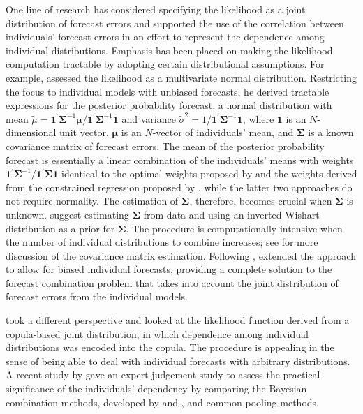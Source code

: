 \documentclass[11pt]{article}
\begin{document}
One line of research has considered specifying the likelihood as a joint distribution of forecast errors and supported the use of the correlation between individuals' forecast errors in an effort to represent the dependence among individual distributions. Emphasis has been placed on making the likelihood computation tractable by adopting certain distributional assumptions. For example, \cite{Winkler1981-bn} assessed the likelihood as a multivariate normal distribution. Restricting the focus to individual models with unbiased forecasts, he derived tractable expressions for the posterior probability forecast, a normal distribution with mean $\tilde{\mu} = \mathbf{1}^{\prime} \boldsymbol{\Sigma}^{-1} \boldsymbol{\mu} / \mathbf{1}^{\prime} \boldsymbol{\Sigma}^{-1} \mathbf{1}$ and variance $\tilde{\sigma}^{2} = 1/\mathbf{1}^{\prime} \boldsymbol{\Sigma}^{-1} \mathbf{1}$, where $\mathbf{1}$ is an $N$-dimensional unit vector, $\boldsymbol{\mu}$ is an $N$-vector of individuals' mean, and $\boldsymbol{\Sigma}$ is a known covariance matrix of forecast errors. The mean of the posterior probability forecast is essentially a linear combination of the individuals' means with weights $\mathbf{1}^{\prime} \boldsymbol{\Sigma}^{-1} / \mathbf{1}^{\prime} \boldsymbol{\Sigma} \mathbf{1}$ identical to the optimal weights proposed by \cite{Bates1969-yj} and the weights derived from the constrained regression proposed by \cite{Granger1984-jc}, while the latter two approaches do not require normality. The estimation of $\boldsymbol{\Sigma}$, therefore, becomes crucial when $\boldsymbol{\Sigma}$ is unknown. \cite{Winkler1981-bn} suggest estimating $\boldsymbol{\Sigma}$ from data and using an inverted Wishart distribution as a prior for $\boldsymbol{\Sigma}$. The procedure is computationally intensive when the number of individual distributions to combine increases; see \cite{Hall2004-tm} for more discussion of the covariance matrix estimation. Following \cite{Winkler1981-bn}, \cite{Palm1992-im} extended the approach to allow for biased individual forecasts, providing a complete solution to the forecast combination problem that takes into account the joint distribution of forecast errors from the individual models.

\cite{Jouini1996-fe} took a different perspective and looked at the likelihood function derived from a copula-based joint distribution, in which dependence among individual distributions was encoded into the copula. The procedure is appealing in the sense of being able to deal with individual forecasts with arbitrary distributions. A recent study by \cite{Wilson2017-ct} gave an expert judgement study to assess the practical significance of the individuals' dependency by comparing the Bayesian combination methods, developed by \cite{Winkler1981-bn} and \cite{Jouini1996-fe}, and common pooling methods.
\end{document}
